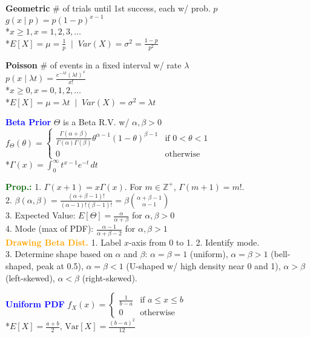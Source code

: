 \documentclass[5pt]{extarticle} %
\begin{document}
\begin{paracol}{3}
{    \textbf{Geometric} \# of trials until 1st success, each w/ prob. $p$ \\
    $ g(x \mid p) = p(1 - p)^{x - 1}$ \\
    *$x \geq 1, x = 1, 2, 3, \dots $ \\
    *$ E[X] = \mu = \frac{1}{p} \; \mid \; Var(X) = \sigma^2 = \frac{1 - p}{p^2} $

    \textbf{Poisson} \# of events in a fixed interval w/ rate $\lambda$ \\
    $ p(x \mid \lambda t) = \frac{e^{-\lambda t} (\lambda t)^x}{x!}$ \\
    *$x \geq 0, x = 0, 1, 2, \dots $ \\
    *$ E[X] = \mu = \lambda t \; \mid \; Var(X) = \sigma^2 = \lambda t $

    \textcolor{blue}{\textbf{Beta Prior}} $\Theta$ is a Beta R.V. w/ $\alpha,\beta>0$\\
    $f_\Theta (\theta) = \begin{cases}
        \frac{\Gamma(\alpha + \beta)}{\Gamma(\alpha) \Gamma(\beta)} \theta^{\alpha - 1} (1 - \theta)^{\beta - 1} & \text{if } 0 < \theta < 1 \\
        0 & \text{otherwise}
    \end{cases}$ \\
    *$\Gamma(x) = \int_{0}^{\infty} t^{x-1} e^{-t} \, dt$

    \textcolor{darkgreen}{\textbf{Prop.:}} 1. $\Gamma(x+1) = x \Gamma(x)$. For $m \in \mathbb{Z}^+$, $\Gamma(m+1) = m!$. \\
    2. $\beta(\alpha,\beta) = \frac{(\alpha + \beta -1)!}{(\alpha - 1)! (\beta - 1)!} = \beta \binom{\alpha + \beta - 1}{\alpha - 1}$ \\
    3. Expected Value: $E[\Theta] = \frac{\alpha}{\alpha + \beta}$ for $\alpha, \beta > 0$ \\
    4. Mode (max of PDF): $\frac{\alpha - 1}{\alpha + \beta - 2}$ for $\alpha, \beta > 1$ \\

    \textcolor{orange}{\textbf{Drawing Beta Dist.}} 1. Label $x$-axis from 0 to 1. 2. Identify mode. \\ 
    3. Determine shape based on $\alpha$ and $\beta$: $\alpha = \beta = 1$ (uniform), $\alpha = \beta > 1$ (bell-shaped, peak at 0.5), $\alpha = \beta < 1$ (U-shaped w/ high density near 0 and 1), $\alpha > \beta$ (left-skewed), $\alpha < \beta$ (right-skewed).

    \textcolor{blue}{\textbf{Uniform PDF}} $f_X(x) = \begin{cases}
        \frac{1}{b - a} & \text{if } a \leq x \leq b \\
        0 & \text{otherwise}
    \end{cases}$ \\
    *$E[X] = \frac{a + b}{2}$, $\text{Var}[X] = \frac{(b - a)^2}{12}$

}
\end{paracol}
\end{document}
